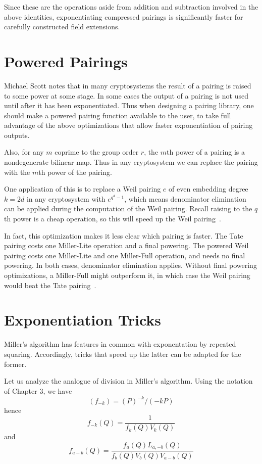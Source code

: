 Since these are the operations aside from addition and
subtraction involved in the above identities,
exponentiating compressed pairings is
significantly faster for carefully constructed field extensions.

\section {Powered Pairings}

Michael Scott notes that in many cryptosystems the result of a pairing is
raised to some power at some stage. In some cases the output of a pairing
is not used until after it has been exponentiated.
Thus when designing a pairing library, one should make
a powered pairing function available to the user, to take full advantage
of the above optimizations that allow faster exponentiation of pairing outputs.

Also, for any $m$ coprime to the group order $r$, the $m$th power of a pairing
is a nondegenerate bilinear map. Thus in any cryptosystem we can replace
the pairing with the $m$th power of the pairing.

One application of this is to replace a Weil pairing $e$ of even embedding
degree $k = 2d$ in any cryptosystem with $e^{q^d-1}$, which means
denominator elimination can be applied
during the computation of the Weil pairing. Recall raising to the $q$th
power is a cheap operation, so this will speed up the Weil pairing~\cite{km}.

In fact, this optimization makes it less clear which pairing
is faster. The Tate pairing costs one Miller-Lite operation and a final
powering. The powered Weil pairing costs one Miller-Lite
and one Miller-Full operation, and needs no final powering.
In both cases, denominator elimination applies. Without
final powering optimizations, a Miller-Full might outperform it,
in which case the Weil pairing would beat the Tate pairing~\cite{gps}.

\section {Exponentiation Tricks}

Miller's algorithm has features in common with exponentation by repeated
squaring. Accordingly, tricks that speed up the latter can be adapted for the
former.

Let us analyze the analogue of division in Miller's algorithm.
Using the notation of Chapter 3, we have
\[
(f_{-k}) = (P)^{-k}/(-kP)
\]
hence
\[
f_{-k}(Q) = \frac{1}{f_k(Q)V_k(Q)}
\]
and
\[
f_{a-b}(Q) = \frac{f_a(Q)L_{a,-b}(Q)}{f_b(Q)V_b(Q)V_{a-b}(Q)}
\]

